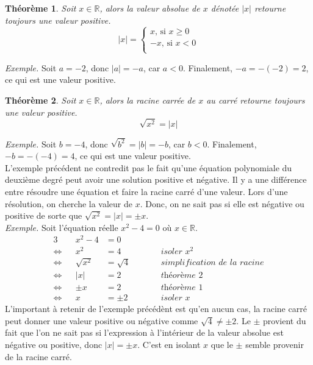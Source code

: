 \documentclass[11pt]{article}
\newenvironment{exemple}
{\noindent\textit{Exemple. }}
{}
\newtheorem{theorem}{Théorème}
\begin{document}

\begin{theorem}
Soit $x\in\mathbb{R}$, alors la valeur absolue de $x$ dénotée $|x|$ retourne toujours une valeur positive.
\begin{equation}
|x|=\left\{
  \begin{array}{r}
     x\text{, si $x \geq 0$}\\
    -x\text{, si $x < 0$}\\
  \end{array}
\right.
\end{equation}
\end{theorem}
\begin{exemple}
Soit $a=-2$, donc $|a|=-a$, car $a<0$. Finalement, $-a=-(-2)=2$, ce qui est une valeur positive.
\end{exemple}

\begin{theorem}
Soit $x\in\mathbb{R}$, alors la racine carrée de $x$ au carré retourne toujours une valeur positive.
\begin{equation}
\sqrt{x^{2}}=|x|
\end{equation}
\end{theorem}
\begin{exemple}
Soit $b=-4$, donc $\sqrt{b^{2}}=|b|=-b$, car $b<0$. Finalement, $-b=-(-4)=4$, ce qui est une valeur positive.
\end{exemple}\\

L'exemple précédent ne contredit pas le fait qu'une équation polynomiale du deuxième degré peut avoir une solution positive et négative. Il y a une différence entre résoudre une équation et faire la racine carré d'une valeur. Lors d'une résolution, on cherche la valeur de $x$. Donc, on ne sait pas si elle est négative ou positive de sorte que $\sqrt{x^{2}}=|x|=\pm x$.\\

\begin{exemple}
Soit l'équation réelle $x^2-4=0$ où $x\in\mathbb{R}$.
\begin{alignat*}{3}
                & &      x^2-4&=0        & &\\
\Leftrightarrow & &        x^2&=4        & &\quad\quad\textit{isoler $x^{2}$}\\
\Leftrightarrow & & \sqrt{x^2}&=\sqrt{4} & &\quad\quad\textit{simplification de la racine}\\
\Leftrightarrow & &        |x|&=2        & &\quad\quad\textit{théorème 2}\\
\Leftrightarrow & &      \pm x&=2        & &\quad\quad\textit{théorème 1}\\
\Leftrightarrow & &          x&=\pm 2    & &\quad\quad\textit{isoler $x$}
\end{alignat*}
\end{exemple}
\indent L'important à retenir de l'exemple précédènt est qu'en aucun cas, la racine carré peut donner une valeur positive ou négative comme $\sqrt{4}\neq\pm 2$. Le $\pm$ provient du fait que l'on ne sait pas si l'expression à l'intérieur de la valeur absolue est négative ou positive, donc $|x|=\pm x$. C'est en isolant $x$ que le $\pm$ semble provenir de la racine carré.\pagebreak
\end{document}
